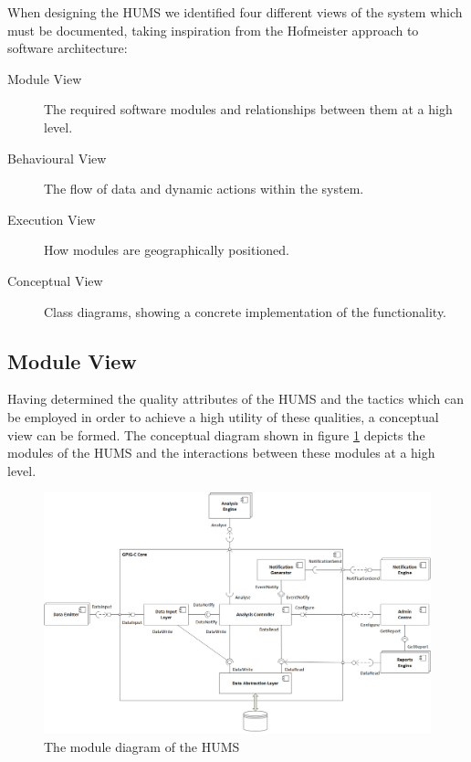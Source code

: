 \documentclass[10pt,a4paper]{article}
\begin{document}
When designing the HUMS we identified four different views of the
system which must be documented, taking inspiration from the
Hofmeister\cite{hof1999} approach to software architecture:

\begin{description}
  \item[Module View] The required software modules and relationships
    between them at a high level.

  \item[Behavioural View] The flow of data and dynamic actions within
    the system.

  \item[Execution View] How modules are geographically positioned.

  \item[Conceptual View] Class diagrams, showing a concrete
    implementation of the functionality.
\end{description}

\subsection{Module View}
\label{sec:architecture-moduleview}

Having determined the quality attributes of the HUMS and the tactics
which can be employed in order to achieve a high utility of these
qualities, a conceptual view can be formed. The conceptual diagram
shown in figure \ref{fig:ComponentDiagram} depicts the modules of the
HUMS and the interactions between these modules at a high level.


\begin{figure}[!ht]
  \centering
  \includegraphics[width=14cm]{images/ComponentDiagram.png}
  \caption{The module diagram of the HUMS}
  \label{fig:ComponentDiagram}
\end{figure}
\end{document}
